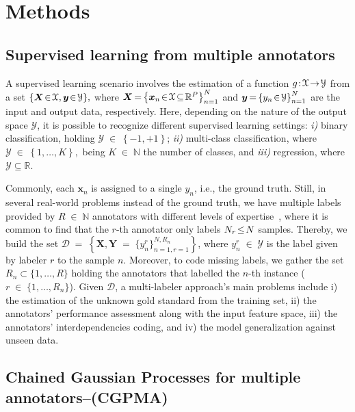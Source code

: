\documentclass[journal]{IEEEtran}
\providecommand{\ve}[1]{{\bm{#1}}}%
\providecommand{\mat}[1]{{\bm{#1}}} %
\newcommand{\Real}{\mathbb{R}}
\DeclareMathOperator{\en}{\!\,\in\!\,}
\DeclareMathOperator{\igual}{\!\,=\!\,}
\providecommand{\s}[1]{\negthinspace#1\negthinspace}%
\providecommand{\ve}[1]{{\mathbf{#1}}}
\providecommand{\mat}[1]{{\mathbf{#1}}}
\begin{document}
\section{Methods}\label{sec:methods}

\subsection{Supervised learning from multiple annotators}
A supervised learning scenario involves the estimation of a function $g\s{:}\mathcal{X}\s{\to}\mathcal{Y}$ from a set $\{\ve{X}\s{\in}\mathcal{X},\ve{y}\s{\in}\mathcal{Y}\},$ where $\mat{X}\igual \left\{\ve{x}_n\s{\in}\mathcal{X}\!\subseteq\!\Real^P\right\}_{n=1}^{N}$ and $\mat{y}\igual\left\{y_n\s{\in} \mathcal{Y}\right\}_{n=1}^{N}$ are the input and output data, respectively. Here, depending on the nature of the output space $\mathcal{Y}$, it is possible to recognize different supervised learning settings: \textit{i)} binary classification, holding $\mathcal{Y}\en \left\{-1,+1\right\}$; \textit{ii)} multi-class classification, where $\mathcal{Y}\en \left\{1,\dots, K\right\},$ being $K\en\mathbb{N}$ the number of classes, and \textit{iii)} regression, where $\mathcal{Y}\subseteq \Real$.

Commonly, each $\ve{x}_n$ is assigned to a single $y_n$, i.e., the ground truth. Still, in several real-world problems instead of the ground truth, we have multiple labels provided by $R \en\mathbb{N}$ annotators with different levels of expertise~\cite{raykar2010learning}, where it is common to find that the $r$-th annotator only labels $N_r\s{\le}N$ samples. Thereby, we build the set $\mathcal{D} \igual \left\{\mat{X}, \mat{Y} \igual \{y_n^r\}_{n=1,r=1}^{N,R_n} \right\}$, where $y_n^r\en \mathcal{Y}$ is the label given by labeler $r$ to the sample $n$. Moreover, to code missing  labels, we gather the set $R_n\subset \{1, \dots, R\}$ holding the annotators that labelled the $n$-th instance ($r\en\{1,\dots,R_n\}$). Given $\mathcal{D}$, a multi-labeler approach's main problems include i) the estimation of the unknown gold standard from the training set, ii) the annotators' performance assessment along with the input feature space, iii) the annotators' interdependencies coding, and iv) the model generalization against unseen data. 
 
\subsection{Chained Gaussian Processes for multiple annotators--(CGPMA)}\label{sec:CGP}
\end{document}

